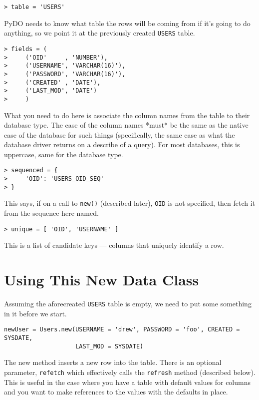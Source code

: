 \documentclass[titlepage]{manual}
\begin{document}
\begin{verbatim}
> table = 'USERS'
\end{verbatim}

PyDO needs to know what table the rows will be coming from if it's
going to do anything, so we point it at the previously created
\texttt{USERS} table.

\begin{verbatim}
> fields = (
>     ('OID'     , 'NUMBER'),
>     ('USERNAME', 'VARCHAR(16)'),
>     ('PASSWORD', 'VARCHAR(16)'),
>     ('CREATED' , 'DATE'),
>     ('LAST_MOD', 'DATE')
>     )
\end{verbatim}

What you need to do here is associate the
column names from the table to their database type.  The case of the
column names *must* be the same as the native case of the database for
such things (specifically, the same case as what the database driver
returns on a describe of a query).  For most databases, this is
uppercase, same for the database type. 

\begin{verbatim}
> sequenced = {
>     'OID': 'USERS_OID_SEQ'
> }
\end{verbatim}

This says, if on a call to \texttt{new()} (described later),
\texttt{OID} is not specified, then fetch it from the sequence here
named.

\begin{verbatim}
> unique = [ 'OID', 'USERNAME' ]
\end{verbatim}

This is a list of candidate keys --- columns that uniquely identify a
row.  

\section{Using This New Data Class}
Assuming the aforecreated \texttt{USERS} table is empty, we need to
put some something in it before we start.

\begin{verbatim}
newUser = Users.new(USERNAME = 'drew', PASSWORD = 'foo', CREATED = SYSDATE,
                    LAST_MOD = SYSDATE)
\end{verbatim}

The new method inserts a new row into the table.  There is an optional
parameter, \texttt{refetch} which effectively calls the
\texttt{refresh} method (described below).  This is useful in the case
where you have a table with default values for columns and you want to
make references to the values with the defaults in place.
\end{document}
